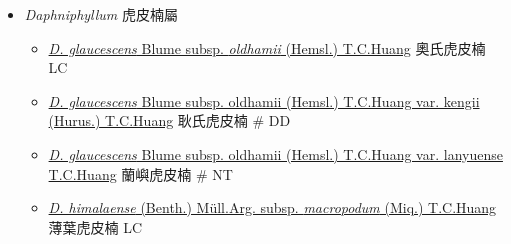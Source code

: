 
  \begin{itemize}
 \item[] \textit{Daphniphyllum} 虎皮楠屬
                                
  \begin{itemize}
        \item[] \href{http://www.theplantlist.org/tpl1.1/search?q=Daphniphyllum+glaucescens+subsp.+oldhamii}{\textit{D. glaucescens} Blume subsp. \textit{oldhamii} (Hemsl.) T.C.Huang}   奧氏虎皮楠   LC
        \item[] \href{http://www.theplantlist.org/tpl1.1/search?q=Daphniphyllum+glaucescens+subsp.+oldhamii+var.+kengii}{\textit{D. glaucescens} Blume subsp. oldhamii (Hemsl.) T.C.Huang var. kengii (Hurus.) T.C.Huang}   耿氏虎皮楠  \# DD
        \item[] \href{http://www.theplantlist.org/tpl1.1/search?q=Daphniphyllum+glaucescens+subsp.+oldhamii+var.+lanyuense}{\textit{D. glaucescens} Blume subsp. oldhamii (Hemsl.) T.C.Huang var. lanyuense T.C.Huang}   蘭嶼虎皮楠  \# NT
        \item[] \href{http://www.theplantlist.org/tpl1.1/search?q=Daphniphyllum+himalaense+subsp.+macropodum}{\textit{D. himalaense} (Benth.) Müll.Arg. subsp. \textit{macropodum} (Miq.) T.C.Huang}   薄葉虎皮楠   LC
  \end{itemize}
  \end{itemize}

